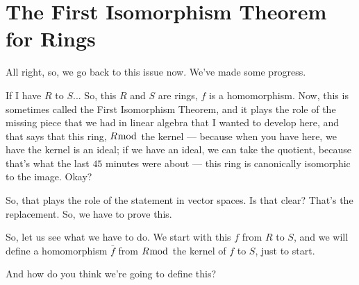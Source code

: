 \section{The First Isomorphism Theorem for Rings}

\begin{speech}[00:50:58 - 00:52:37]
All right, so, we go back to this issue now. We've made some progress. 

If I have $R$ to $S$...  So, this $R$ and $S$ are rings, $f$ is a homomorphism. Now, this is sometimes called the First Isomorphism Theorem,  and it plays the role of the missing piece that we had in linear algebra that I wanted to develop here, and that says that this ring, $R \bmod$ the kernel  --- because when you have here, we have the kernel is an ideal; if we have an ideal, we can take the quotient, because that's what the last $45$ minutes were about --- this ring is canonically isomorphic to the image.  Okay? 

So, that plays the role of the statement in vector spaces. Is that clear? That's the replacement. So, we have to prove this. 

So, let us see what we have to do. We start with this $f$ from $R$ to $S$,  and we will define a homomorphism  $\bar{f}$ from $R \bmod$ the kernel of $f$ to $S$,  just to start. 

And how do you think we're going to define this?
\end{speech}

